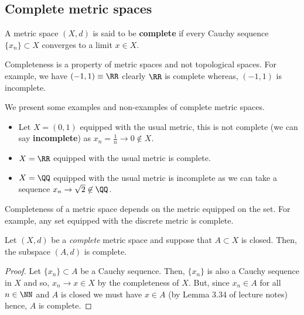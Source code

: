 \documentclass[12pt, a4paper]{article}
\begin{document}
\subsection{Complete metric spaces}

\begin{definition}
    A metric space \((X,d)\) is said to be \textbf{complete} if every Cauchy sequence \(\{x_n\} \subset X\) converges to a limit \(x \in X\).
\end{definition}

\begin{mdremark}
    Completeness is a property of metric spaces and not topological spaces. For example, we have \((-1,1) \equiv \RR\)
    clearly \(\RR\) is complete whereas, \((-1,1)\) is incomplete.
\end{mdremark}

\begin{mdexample}
    We present some examples and non-examples of complete metric spaces.
    \begin{itemize}
        \item Let \(X=(0,1)\) equipped with the usual metric, this is not complete (we can say \textbf{incomplete}) as \(x_n = \frac{1}{n} \to 0 \not\in X\). 
        \item \(X =\RR\) equipped with the usual metric is complete.
        \item \(X =\QQ\) equipped with the usual metric is incomplete as we can take a sequence \(x_n \to \sqrt{2} \not\in \QQ\).
    \end{itemize}
\end{mdexample}

\begin{mdremark}
    Completeness of a metric space depends on the metric equipped on the set. For example, any set equipped with the discrete metric is complete.
\end{mdremark}

\begin{proposition}
    Let \((X,d)\) be a \textit{complete} metric space and suppose that \(A \subset X\) is closed. Then, the subspace \((A,d)\) is complete.
\end{proposition}

\begin{proof}
    Let \(\{x_n\} \subset A\) be a Cauchy sequence. Then, \(\{x_n\}\) is also a Cauchy sequence in \(X\) and so, \(x_n \to x \in X\) by the completeness of \(X\). But, since \(x_n \in A\) for all \(n \in \NN\) and \(A\) is closed we must have \(x \in A\) (by Lemma 3.34 of lecture notes) hence, \(A\) is complete.
\end{proof}
\end{document}
